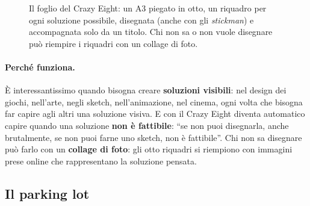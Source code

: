 \begin{figure}[htbp]
\centering
{}
\caption{Il foglio del Crazy Eight: un A3 piegato in otto, un riquadro per ogni soluzione
possibile, disegnata (anche con gli \emph{stickman}) e accompagnata solo da un titolo.
Chi non sa o non vuole disegnare può riempire i riquadri con un collage di foto.}
\label{a5:fig:crazy8}
\end{figure}

\paragraph{Perché funziona.} È interessantissimo quando bisogna creare \textbf{soluzioni
visibili}: nel design dei giochi, nell'arte, negli sketch, nell'animazione, nel cinema,
ogni volta che bisogna far capire agli altri una soluzione visiva. E con il Crazy Eight
diventa automatico capire quando una soluzione \textbf{non è fattibile}: ``se non puoi
disegnarla, anche brutalmente, se non puoi farne uno sketch, non è fattibile''. Chi non sa
disegnare può farlo con un \textbf{collage di foto}: gli otto riquadri si riempiono con
immagini prese online che rappresentano la soluzione pensata.

\subsection{Il parking lot}


